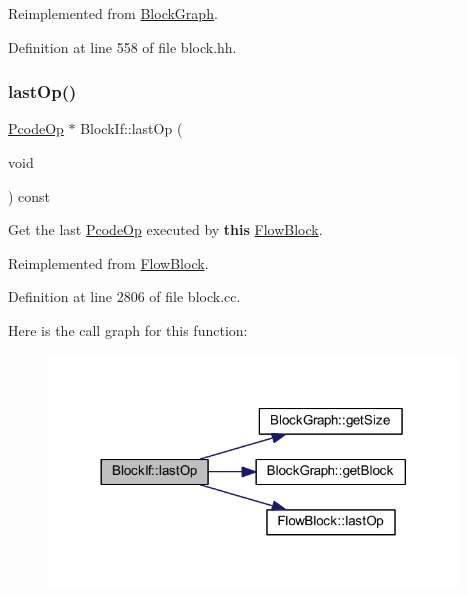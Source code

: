 Reimplemented from \mbox{\hyperlink{class_block_graph_a8e542e109e0acc977218ceaf3c248153}{Block\+Graph}}.



Definition at line 558 of file block.\+hh.

\mbox{\label{class_block_if_a94053e78df44aef0ee7a225dc4f3a5a5}} 
\subsubsection{\texorpdfstring{lastOp()}{lastOp()}}
{\footnotesize\ttfamily \mbox{\hyperlink{class_pcode_op}{Pcode\+Op}} $\ast$ Block\+If\+::last\+Op (\begin{DoxyParamCaption}\item[{void}]{ }\end{DoxyParamCaption}) const\hspace{0.3cm}{\ttfamily [virtual]}}



Get the last \mbox{\hyperlink{class_pcode_op}{Pcode\+Op}} executed by {\bfseries{this}} \mbox{\hyperlink{class_flow_block}{Flow\+Block}}. 



Reimplemented from \mbox{\hyperlink{class_flow_block_a5db2a7d4baa2070ebf3151b13fd16d09}{Flow\+Block}}.



Definition at line 2806 of file block.\+cc.

Here is the call graph for this function\+:
\nopagebreak
\begin{figure}[H]
\begin{center}
\leavevmode
\includegraphics[width=308pt]{class_block_if_a94053e78df44aef0ee7a225dc4f3a5a5_cgraph}
\end{center}
\end{figure}
\mbox{\label{class_block_if_a7e394df8ba02a9ba48bd9ec239e84d52}} 
